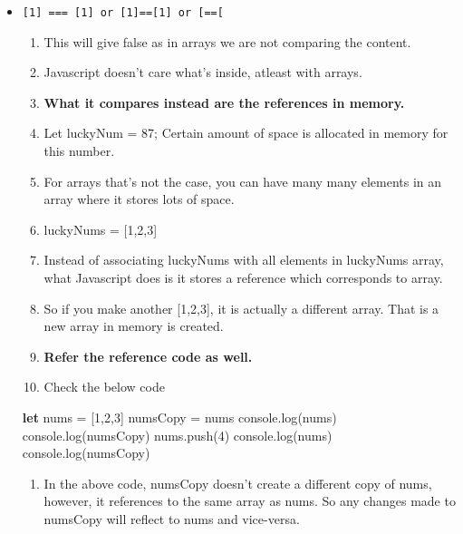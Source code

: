 \documentclass[
  paper=a4,
  ,captions=tableheading
]{scrartcl}
\newenvironment{Shaded}{}{}
\newcommand{\BuiltInTok}[1]{\textcolor[rgb]{0.00,0.50,0.00}{#1}}
\newcommand{\DecValTok}[1]{\textcolor[rgb]{0.25,0.63,0.44}{#1}}
\newcommand{\FunctionTok}[1]{\textcolor[rgb]{0.02,0.16,0.49}{#1}}
\newcommand{\KeywordTok}[1]{\textcolor[rgb]{0.00,0.44,0.13}{\textbf{#1}}}
\newcommand{\NormalTok}[1]{#1}
\newcommand{\OperatorTok}[1]{\textcolor[rgb]{0.40,0.40,0.40}{#1}}
\providecommand{\tightlist}{%
  \setlength{\itemsep}{0pt}\setlength{\parskip}{0pt}}
\begin{document}
\begin{itemize}
\tightlist
\item
  \texttt{{[}1{]}\ ===\ {[}1{]}\ or\ {[}1{]}=={[}1{]}\ or\ {[}\textquotesingle{}\textquotesingle{}{]}=={[}\textquotesingle{}\textquotesingle{}{]}}

  \begin{enumerate}
  \def\labelenumi{\arabic{enumi}.}
  \tightlist
  \item
    This will give false as in arrays we are not comparing the content.
  \item
    Javascript doesn't care what's inside, atleast with arrays.
  \item
    \textbf{What it compares instead are the references in memory.}
  \item
    Let luckyNum = 87; Certain amount of space is allocated in memory
    for this number.
  \item
    For arrays that's not the case, you can have many many elements in
    an array where it stores lots of space.
  \item
    luckyNums = {[}1,2,3{]}
  \item
    Instead of associating luckyNums with all elements in luckyNums
    array, what Javascript does is it stores a reference which
    corresponds to array.
  \item
    So if you make another {[}1,2,3{]}, it is actually a different
    array. That is a new array in memory is created.
  \item
    \textbf{Refer the reference code as well.}
  \item
    Check the below code
  \end{enumerate}

\begin{Shaded}
\begin{Highlighting}[]
\KeywordTok{let}\NormalTok{ nums }\OperatorTok{=}\NormalTok{ [}\DecValTok{1}\OperatorTok{,}\DecValTok{2}\OperatorTok{,}\DecValTok{3}\NormalTok{]}
\NormalTok{numsCopy }\OperatorTok{=}\NormalTok{ nums}
\BuiltInTok{console}\OperatorTok{.}\FunctionTok{log}\NormalTok{(nums)}
\BuiltInTok{console}\OperatorTok{.}\FunctionTok{log}\NormalTok{(numsCopy)}
\NormalTok{nums}\OperatorTok{.}\FunctionTok{push}\NormalTok{(}\DecValTok{4}\NormalTok{)}
\BuiltInTok{console}\OperatorTok{.}\FunctionTok{log}\NormalTok{(nums)}
\BuiltInTok{console}\OperatorTok{.}\FunctionTok{log}\NormalTok{(numsCopy)}
\end{Highlighting}
\end{Shaded}

  \begin{enumerate}
  \def\labelenumi{\arabic{enumi}.}
  \setcounter{enumi}{10}
  \tightlist
  \item
    In the above code, numsCopy doesn't create a different copy of nums,
    however, it references to the same array as nums. So any changes
    made to numsCopy will reflect to nums and vice-versa.
  \end{enumerate}
\end{itemize}
\end{document}
